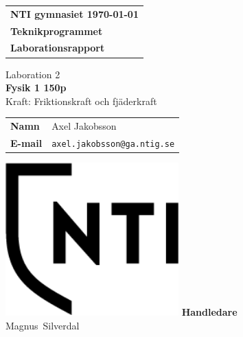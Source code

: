 \documentclass[11p, titlepage, oneside, a4paper]{article}
\makeatletter
\def\inst{Teknikprogrammet}
\def\typeofdoc{Laborationsrapport}
\def\course{Fysik 1 150p}
\def\pretitle{Laboration 2}
\def\title{Kraft: Friktionskraft och fjäderkraft}
\def\name{Axel Jakobsson}
\def\username{axel.jakobsson}
\def\email{\username{}@ga.ntig.se}
\def\graders{Magnus Silverdal}
\makeatother
\begin{document}
    \begin{titlepage}
        \thispagestyle{empty}
        \begin{large}
            \begin{tabular}{@{}p{\textwidth}@{}}
                \textbf{NTI gymnasiet \hfill \today} \\
                \textbf{\inst} \\
                \textbf{\typeofdoc} \\
            \end{tabular}
        \end{large}
        \vspace{10mm}
        \begin{center}
            \LARGE{\pretitle} \\
            \huge{\textbf{\course}}\\
            \vspace{10mm}
            \LARGE{\title} \\
            \vspace{15mm}
            \begin{large}
                \begin{tabular}{ll}
                    \textbf{Namn} & \name \\
                    \textbf{E-mail} & \texttt{\email} \\
                \end{tabular}
            \end{large}
            \vfill
            \includegraphics[width=0.5\textwidth]{images/NTI Gymnasiet_Symbol_print_svart.png}
            \vfill
            \large{\textbf{Handledare}}\\
            \mbox{\large{\graders}}
        \end{center}
    \end{titlepage}
\end{document}
